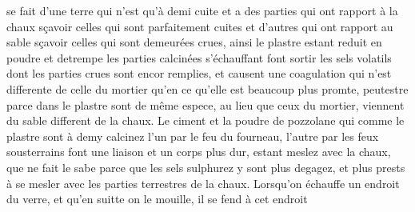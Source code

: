 se fait d'une terre\protect{} qui n'est qu'\`{a}
demi cuite et a des parties qui ont rapport \`{a} la chaux\protect{} s\c{c}avoir celles qui sont parfaitement
cuites et d'autres qui ont rapport au sable s\c{c}avoir celles qui sont demeur\'{e}es crues,
ainsi le plastre\protect{} estant reduit en poudre\protect{}
et detrempe les parties calcin\'{e}es s'\'{e}chauffant font sortir les sels\protect{}
volatils dont les parties crues sont encor remplies, et causent une coagulation\protect{}
qui n'est differente de celle du mortier\protect{} qu'en ce qu'elle est beaucoup plus promte, peutestre parce
dans le plastre\protect{} sont de m\^{e}me espece,
au lieu que ceux du mortier\protect{}, viennent du sable different de la chaux\protect{}.%
%
\pend%
\pstart%
Le \protect{}ciment
%
et la poudre\protect{} de pozzolane
qui comme le plastre\protect{} sont \`{a} demy calcinez l'un par le feu\protect{} du fourneau\protect{}, l'autre par
les feux\protect{} sousterrains font une liaison et un corps plus dur,
estant meslez avec la \protect{}chaux,
que ne fait le sabe parce que les sels\protect{} sulphurez y sont plus degagez,
et plus prests \`{a} se mesler avec les parties terrestres de la \protect{}chaux.%
%
\pend%
\count{}
\count{}
\pstart%
Lorsqu'on
%
\'{e}chauffe un endroit du verre\protect{}, et qu'en suitte on le mouille, il se fend \`{a} cet endroit
